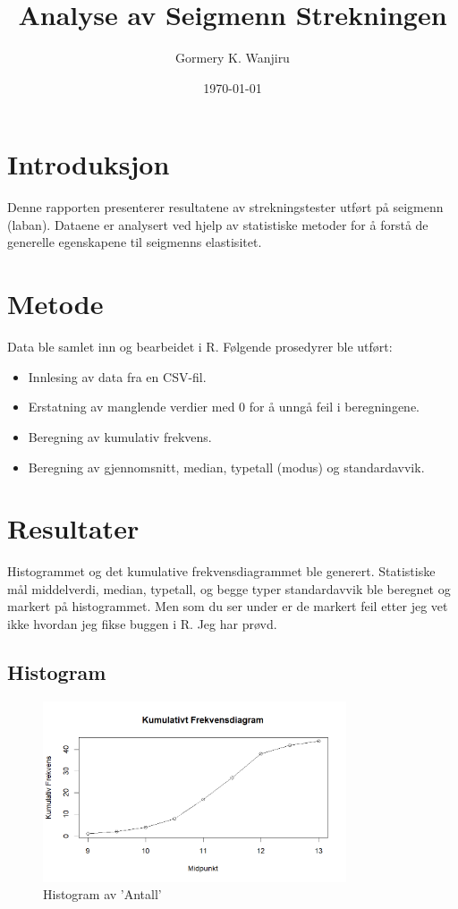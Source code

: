 \documentclass{article}
\begin{document}
\title{Analyse av Seigmenn Strekningen}
\author{Gormery K. Wanjiru}
\date{\today}
\maketitle

\section{Introduksjon}
Denne rapporten presenterer resultatene av strekningstester utført på seigmenn (laban). Dataene er analysert ved hjelp av statistiske metoder for å forstå de generelle egenskapene til seigmenns elastisitet.

\section{Metode}
Data ble samlet inn og bearbeidet i R. Følgende prosedyrer ble utført:
\begin{itemize}
    \item Innlesing av data fra en CSV-fil.
    \item Erstatning av manglende verdier med 0 for å unngå feil i beregningene.
    \item Beregning av kumulativ frekvens.
    \item Beregning av gjennomsnitt, median, typetall (modus) og standardavvik.
\end{itemize}

\section{Resultater}
Histogrammet og det kumulative frekvensdiagrammet ble generert. Statistiske mål middelverdi, median, typetall, og begge typer standardavvik ble beregnet og markert på histogrammet.
Men som du ser under er de markert feil etter jeg vet ikke hvordan jeg fikse buggen i R. Jeg har prøvd.

\subsection{Histogram}
\begin{figure}[H]
    \centering
    \includegraphics[width=0.8\textwidth]{Rplot.png}
    \caption{Histogram av 'Antall'}
\end{figure}
\end{document}
